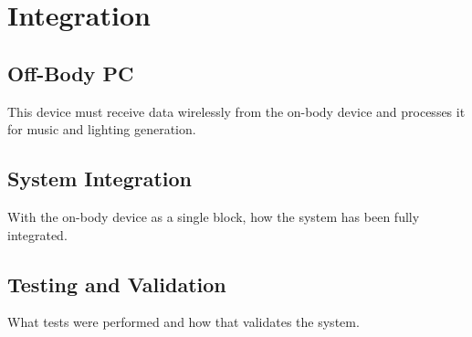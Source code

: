 \chapter{Integration}

\section{Off-Body PC}
This device must receive data wirelessly from the on-body device and processes it for music and lighting generation.




\section{System Integration}
With the on-body device as a single block, how the system has been fully integrated.

\section{Testing and Validation}
What tests were performed and how that validates the system.
